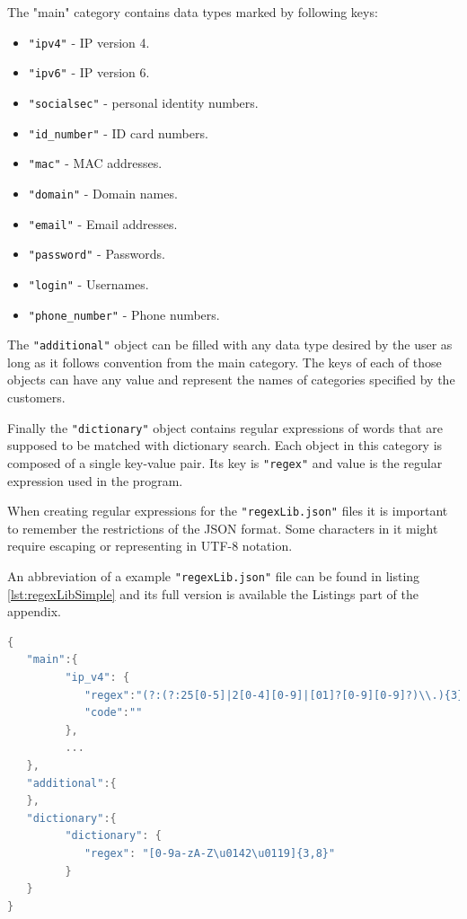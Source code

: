 \documentclass[a4paper,twoside,12pt]{book}
\begin{document}
The "main" category contains data types marked by following keys:

\begin{itemize}
   \item \lstinline|"ipv4"| - IP version 4.
   \item \lstinline|"ipv6"| - IP version 6.
   \item \lstinline|"socialsec"| - personal identity numbers.
   \item \lstinline|"id_number"| - ID card numbers.
   \item \lstinline|"mac"| - MAC addresses.
   \item \lstinline|"domain"| - Domain names.
   \item \lstinline|"email"| - Email addresses.
   \item \lstinline|"password"| - Passwords.
   \item \lstinline|"login"| - Usernames.
   \item \lstinline|"phone_number"| - Phone numbers.
\end{itemize} 

The \lstinline|"additional"| object can be filled with any data type desired by the user as long 
as it follows convention from the main category. The keys of each of those objects can have any value and represent the names of categories
specified by the customers.

Finally the \lstinline|"dictionary"| object contains regular expressions of words that are supposed to be matched with dictionary search. Each object in this category 
is composed of a single key-value pair. Its key is \lstinline|"regex"| and value is the regular expression used in the program. 

When creating regular expressions for the \lstinline|"regexLib.json"| files it is important to remember the restrictions of the 
JSON format. Some characters in it might require escaping or representing in UTF-8 notation.

An abbreviation of a example \lstinline|"regexLib.json"| file can be found in listing \ref{lst:regexLibSimple} and its full version is available the Listings part of the appendix.

\begin{lstlisting}[float=!ht,language=C++,label=lst:regexLibSimple,caption={Shortened "regexLib.json" file.},frame=lines,framexleftmargin=0.5em,captionpos=b,escapechar=^,texcl=true,breaklines=true]
{
   "main":{
         "ip_v4": {
            "regex":"(?:(?:25[0-5]|2[0-4][0-9]|[01]?[0-9][0-9]?)\\.){3}(?:25[0-5]|2[0-4][0-9]|[01]?[0-9][0-9]?)",
            "code":""
         },
         ...
   },
   "additional":{
   },
   "dictionary":{
         "dictionary": {
            "regex": "[0-9a-zA-Z\u0142\u0119]{3,8}"
         }
   }
}
\end{lstlisting}
\end{document}
